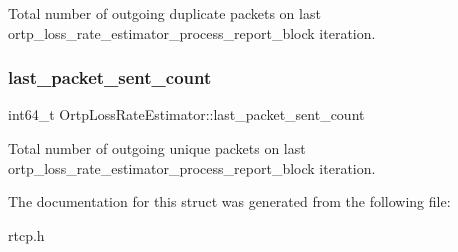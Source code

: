 Total number of outgoing duplicate packets on last ortp\+\_\+loss\+\_\+rate\+\_\+estimator\+\_\+process\+\_\+report\+\_\+block iteration. \mbox{\label{structOrtpLossRateEstimator_a8b56287327b45b673640eb8db37b5065}} 
\subsubsection{last\+\_\+packet\+\_\+sent\+\_\+count}
{\footnotesize\ttfamily int64\+\_\+t Ortp\+Loss\+Rate\+Estimator\+::last\+\_\+packet\+\_\+sent\+\_\+count}

Total number of outgoing unique packets on last ortp\+\_\+loss\+\_\+rate\+\_\+estimator\+\_\+process\+\_\+report\+\_\+block iteration. 

The documentation for this struct was generated from the following file\+:\begin{DoxyCompactItemize}
\item 
rtcp.\+h\end{DoxyCompactItemize}
